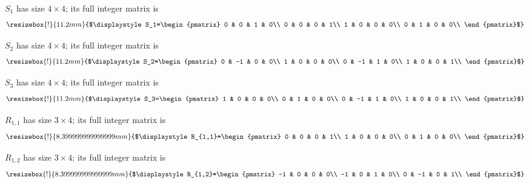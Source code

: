 \begingroup
\setlength{\arraycolsep}{1.7pt}
\renewcommand{\arraystretch}{0.88}
\par\smallskip\noindent
$S_1$ has size $4\times 4$; its full integer matrix is
\[
\resizebox{!}{11.2mm}{$\displaystyle S_1=\begin{pmatrix}
0 & 0 & 1 & 0\\
0 & 0 & 0 & 1\\
1 & 0 & 0 & 0\\
0 & 1 & 0 & 0\\
\end{pmatrix}$}
\]
\par\smallskip\noindent
$S_2$ has size $4\times 4$; its full integer matrix is
\[
\resizebox{!}{11.2mm}{$\displaystyle S_2=\begin{pmatrix}
0 & -1 & 0 & 0\\
1 & 0 & 0 & 0\\
0 & -1 & 1 & 0\\
1 & 0 & 0 & 1\\
\end{pmatrix}$}
\]
\par\smallskip\noindent
$S_3$ has size $4\times 4$; its full integer matrix is
\[
\resizebox{!}{11.2mm}{$\displaystyle S_3=\begin{pmatrix}
1 & 0 & 0 & 0\\
0 & 1 & 0 & 0\\
0 & -1 & 1 & 0\\
1 & 0 & 0 & 1\\
\end{pmatrix}$}
\]
\par\smallskip\noindent
$R_{1,1}$ has size $3\times 4$; its full integer matrix is
\[
\resizebox{!}{8.399999999999999mm}{$\displaystyle R_{1,1}=\begin{pmatrix}
0 & 0 & 0 & 1\\
1 & 0 & 0 & 0\\
0 & 1 & 0 & 0\\
\end{pmatrix}$}
\]
\par\smallskip\noindent
$R_{1,2}$ has size $3\times 4$; its full integer matrix is
\[
\resizebox{!}{8.399999999999999mm}{$\displaystyle R_{1,2}=\begin{pmatrix}
-1 & 0 & 0 & 0\\
-1 & 0 & 1 & 0\\
0 & -1 & 0 & 1\\
\end{pmatrix}$}
\]
\par\smallskip\noindent
